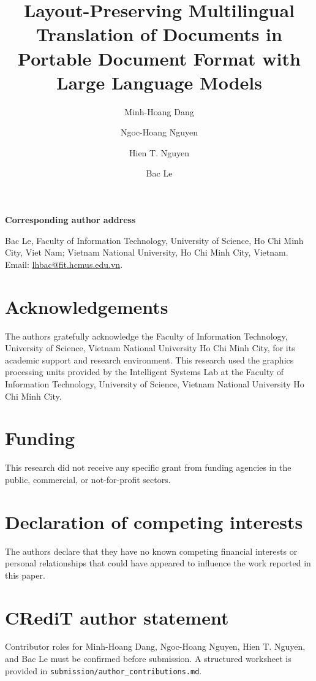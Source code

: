 \documentclass[preprint,12pt,authoryear]{elsarticle}
\begin{document}
\begin{frontmatter}

\title{Layout-Preserving Multilingual Translation of Documents in Portable
Document Format with Large Language Models}

\author[aff1,aff2]{Minh-Hoang Dang}

\author[aff1,aff2]{Ngoc-Hoang Nguyen}

\author[aff3]{Hien T. Nguyen}

\author[aff1,aff2]{Bac Le}


\address[aff1]{Faculty of Information Technology, University of Science,
Ho Chi Minh City, Viet Nam}
\address[aff2]{Vietnam National University, Ho Chi Minh City, Vietnam}
\address[aff3]{Artificial Intelligence Program, Ho Chi Minh University of
Banking, Ho Chi Minh City, Vietnam}

\end{frontmatter}

\noindent\textbf{Corresponding author address}\par
Bac Le, Faculty of Information Technology, University of Science, Ho Chi Minh
City, Viet Nam; Vietnam National University, Ho Chi Minh City, Vietnam. Email:
\url{lhbac@fit.hcmus.edu.vn}.

\section*{Acknowledgements}
The authors gratefully acknowledge the Faculty of Information Technology,
University of Science, Vietnam National University Ho Chi Minh City, for its
academic support and research environment. This research used the graphics
processing units provided by the Intelligent Systems Lab at the Faculty of
Information Technology, University of Science, Vietnam National University Ho
Chi Minh City.

\section*{Funding}
This research did not receive any specific grant from funding agencies in the
public, commercial, or not-for-profit sectors.

\section*{Declaration of competing interests}
The authors declare that they have no known competing financial interests or
personal relationships that could have appeared to influence the work reported
in this paper.

\section*{CRediT author statement}
Contributor roles for Minh-Hoang Dang, Ngoc-Hoang Nguyen, Hien T. Nguyen, and
Bac Le must be confirmed before submission. A structured worksheet is provided
in \texttt{submission/author\_contributions.md}.
\end{document}
